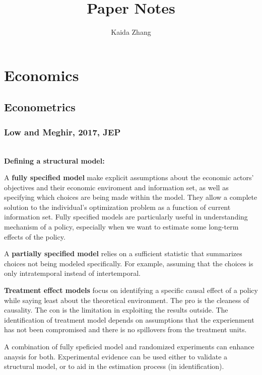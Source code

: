 \documentclass{book}
\title{Paper Notes}
\author{Kaida Zhang}
\date{}
\theoremstyle{plain}
\theoremstyle{definition}
\begin{document}

\tableofcontents{}
\label{toc}
\setcounter{tocdepth}{1}			%


\part{Economics}
\label{part:economics}

\chapter{Econometrics}
\label{cha:econometrics}


\section{Low and Meghir, 2017, JEP} %
\label{sec:low_and_meghir_jep_2017}

\textbf{}\\

\textbf{Defining a structural model:}

A \textbf{fully specified model} make explicit assumptions about the economic actors' objectives and their economic enviroment and information set, as well as specifying which choices are being made within the model. They allow a complete solution to the individual's optimization problem as a function of current information set.
Fully specified models are particularly useful in understanding mechanism of a policy, especially when we want to estimate some long-term effects of the policy.

A \textbf{partially specified model} relies on a sufficient statistic that summarizes choices not being modeled specifically. For example, assuming that the choices is only intratemporal instead of intertemporal.

\textbf{Treatment effect models} focus on identifying a specific causal effect of a policy while saying least about the theoretical environment. The pro is the cleaness of causality. The con is the limitation in exploiting the results outside. The identification of treatment model depends on assumptions that the experienment has not been compromised and there is no spillovers from the treatment units.

A combination of fully speficied model and randomized experiments can enhance anaysis for both. Experimental evidence can be used either to validate a structural model, or to aid in the estimation process (in identification).
\end{document}

